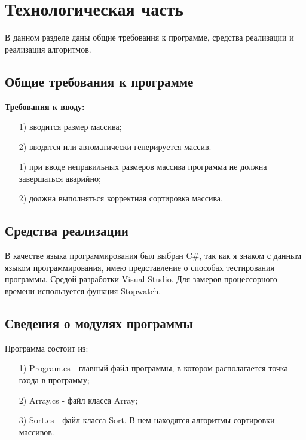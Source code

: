 \documentclass[12pt]{report}
\begin{document}
	\chapter{Технологическая часть}
	В данном разделе даны общие требования к программе, средства реализации и реализация алгоритмов.

	\section{Общие требования к программе}
	\textbf{Требования к вводу:}
	\begin{enumerate}
		\item[1)] вводится размер массива;
		\item[2)] вводятся или автоматически генерируется массив. 
	\end{enumerate}
	\begin{enumerate}
		\item[1)] при вводе неправильных размеров массива программа не должна завершаться аварийно;
		\item[2)] должна выполняться корректная сортировка массива. 
	\end{enumerate}

	\section{Средства реализации}
	В качестве языка программирования был выбран C\#, так как я знаком с данным языком программирования, имею представление о способах тестирования программы.
	\noindent Средой разработки Visual Studio.
	\noindent Для замеров процессорного времени используется функция Stopwatch.

	\section{Сведения о модулях программы}
	Программа состоит из:
	\begin{enumerate}
		\item[1)] Program.cs - главный файл программы, в котором располагается точка входа в программу;
		\item[2)] Array.cs - файл класса Array;
		\item[3)] Sort.cs - файл класса Sort. В нем находятся алгоритмы сортировки массивов.
	\end{enumerate}
\end{document}
